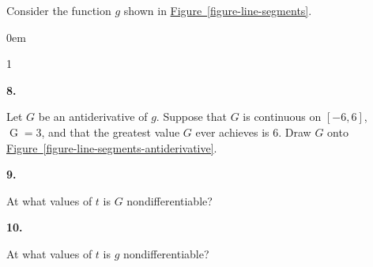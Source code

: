 \documentclass[12pt,]{book}
\theoremstyle{plain}
\theoremstyle{definition}
\numberwithin{equation}{section}
\newcounter{figstack}
\newcounter{figindex}
\newlength\fight
\newcommand\pushValignCaptionBottom[5][b]{%
\stepcounter{figstack}%
\expandafter\def\csname %
figalign\romannumeral\value{figstack}\endcsname{#1}%
\expandafter\def\csname %
figtype\romannumeral\value{figstack}\endcsname{#2}%
\expandafter\def\csname %
figwd\romannumeral\value{figstack}\endcsname{#3}%
\expandafter\def\csname %
figcontent\romannumeral\value{figstack}\endcsname{#4}%
\expandafter\def\csname %
figcap\romannumeral\value{figstack}\endcsname{#5}%
\setbox0=\hbox{%
\begin{#2}{#3}#4\end{#2}}%
\ifdim\dimexpr\ht0+\dp0\relax>\fight\global\setlength{\fight}{%
\dimexpr\ht0+\dp0\relax}\fi%
}
\newcommand\popValignCaptionBottom{%
\setcounter{figindex}{0}%
\hfill%
\whiledo{\value{figindex}<\value{figstack}}{%
\stepcounter{figindex}%
\def\tmp{\csname figwd\romannumeral\value{figindex}\endcsname}%
\begin{\csname figtype\romannumeral\value{figindex}\endcsname}[t]{\tmp}%
\centering%
\stackinset{c}{}%
{\csname figalign\romannumeral\value{figindex}\endcsname}{}%
{\csname figcontent\romannumeral\value{figindex}\endcsname}%
{\rule{0pt}{\fight}}\par%
\csname figcap\romannumeral\value{figindex}\endcsname%
\end{\csname figtype\romannumeral\value{figindex}\endcsname}%
\hfill%
}%
\setcounter{figstack}{0}%
\setlength{\fight}{0pt}%
\hfill%
}
\newenvironment{exercisegroup}%
{\medskip\noindent}%
{\par\bigskip}%
\newlength{\exercisegroupindent}%
\newlength{\exercisegroupitemwidth}%
\newenvironment{exercisegrouplist}%
{\vspace{-\partopsep}%
\begin{adjustwidth}{\exercisegroupindent}{0em}}%
{\end{adjustwidth}%
\vspace{-\partopsep}%
\vspace{\baselineskip}}%
\newenvironment{exercisegroupbycol}[1]%
{\begin{exercisegrouplist}%
\vspace{-\multicolsep}%
\begin{multicols}{#1}%
\setlength{\parindent}{0em}%
\setlength{\exercisegroupitemwidth}{\linewidth}}%
{\end{multicols}%
\vspace{-\multicolsep}%
\end{exercisegrouplist}}%
\newenvironment{exercisegroupitem}[1]%
{\begin{minipage}[t]{\exercisegroupitemwidth}
\vspace{0pt}%
{\bfseries#1}%
\rule{0pt}{\baselineskip}}{\strut%
\end{minipage}%
\hspace{\columnsep}}%
\providecommand\phantomsection{}
\newcommand{\fe}[2]{\mathop{{#1}{\left(#2\right)}}}
\newcommand{\cinterval}[2]{\left[#1,#2\right]}
\begin{document}
\begin{exercisegroup}%
Consider the function \(g\) shown in \hyperref[figure-line-segments]{Figure~\ref*{figure-line-segments}}.%
\par
\begin{exercisegroupbycol}{1}%
\begin{exercisegroupitem}{8. }\phantomsection\hypertarget{exercise-248}{\null}
Let \(G\) be an antiderivative of \(g\).  Suppose that \(G\) is continuous on \(\cinterval{-6}{6}\), \(\fe{G}{6}=3\), and that the greatest value \(G\) ever achieves is \(6\).  Draw \(G\) onto \hyperref[figure-line-segments-antiderivative]{Figure~\ref*{figure-line-segments-antiderivative}}.%
\end{exercisegroupitem}%
\par%
\begin{exercisegroupitem}{9. }\phantomsection\hypertarget{exercise-249}{\null}
At what values of \(t\) is \(G\) nondifferentiable?%
\end{exercisegroupitem}%
\par%
\begin{exercisegroupitem}{10. }\phantomsection\hypertarget{exercise-250}{\null}
At what values of \(t\) is \(g\) nondifferentiable?%
\end{exercisegroupitem}%
\par%
\end{exercisegroupbycol}%
\end{exercisegroup}%
\end{document}
